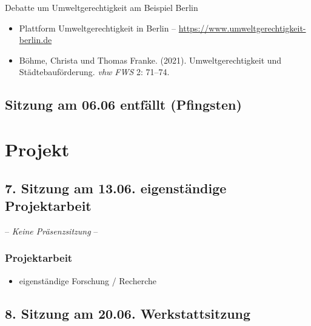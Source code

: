 \documentclass[
  ngerman,
]{article}
\providecommand{\tightlist}{%
  \setlength{\itemsep}{0pt}\setlength{\parskip}{0pt}}
\begin{document}
Debatte um Umweltgerechtigkeit am Beispiel Berlin

\begin{itemize}
\tightlist
\item
  Plattform Umweltgerechtigkeit in Berlin -- \url{https://www.umweltgerechtigkeit-berlin.de}
\item
  Böhme, Christa und Thomas Franke. (2021). Umweltgerechtigkeit und Städtebauförderung. \emph{vhw FWS} 2: 71--74.
\end{itemize}

\hypertarget{sitzung-am-06.06-entfuxe4llt-pfingsten}{%
\subsection*{Sitzung am 06.06 entfällt (Pfingsten)}\label{sitzung-am-06.06-entfuxe4llt-pfingsten}}

\hypertarget{projekt}{%
\section*{Projekt}\label{projekt}}

\hypertarget{sitzung-am-13.06.-eigenstuxe4ndige-projektarbeit}{%
\subsection*{7. Sitzung am 13.06. \textbar{} eigenständige Projektarbeit}\label{sitzung-am-13.06.-eigenstuxe4ndige-projektarbeit}}

-- \emph{Keine Präsenzsitzung} --

\hypertarget{projektarbeit-5}{%
\subsubsection*{Projektarbeit}\label{projektarbeit-5}}

\begin{itemize}
\tightlist
\item
  eigenständige Forschung / Recherche
\end{itemize}

\hypertarget{sitzung-am-20.06.-werkstattsitzung}{%
\subsection*{8. Sitzung am 20.06. \textbar{} Werkstattsitzung}\label{sitzung-am-20.06.-werkstattsitzung}}
\end{document}
